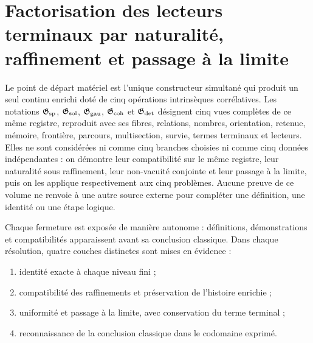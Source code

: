 \section{Factorisation des lecteurs terminaux par naturalité, raffinement et passage à la limite}

Le point de départ matériel est l’unique constructeur simultané qui produit un seul continu enrichi doté de cinq opérations intrinsèques corrélatives. Les notations \(\mathfrak G_{\rm sp}\), \(\mathfrak G_{\rm sol}\), \(\mathfrak G_{\rm gau}\), \(\mathfrak G_{\rm coh}\) et \(\mathfrak G_{\rm det}\) désignent cinq vues complètes de ce même registre, reproduit avec ses fibres, relations, nombres, orientation, retenue, mémoire, frontière, parcours, multisection, survie, termes terminaux et lecteurs. Elles ne sont considérées ni comme cinq branches choisies ni comme cinq données indépendantes : on démontre leur compatibilité sur le même registre, leur naturalité sous raffinement, leur non-vacuité conjointe et leur passage à la limite, puis on les applique respectivement aux cinq problèmes. Aucune preuve de ce volume ne renvoie à une autre source externe pour compléter une définition, une identité ou une étape logique.

Chaque fermeture est exposée de manière autonome : définitions, démonstrations et compatibilités apparaissent avant sa conclusion classique. Dans chaque résolution, quatre couches distinctes sont mises en évidence :
\begin{enumerate}
  \item identité exacte à chaque niveau fini ;
  \item compatibilité des raffinements et préservation de l’histoire enrichie ;
  \item uniformité et passage à la limite, avec conservation du terme terminal ;
  \item reconnaissance de la conclusion classique dans le codomaine exprimé.
\end{enumerate}

